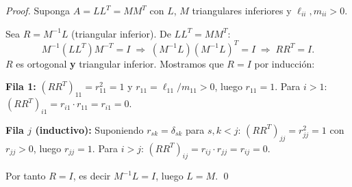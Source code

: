 \documentclass[11pt,a4paper]{article}
\begin{document}
\begin{proof}
Suponga $A = LL^T = MM^T$ con $L$, $M$ triangulares inferiores y $\ell_{ii},m_{ii}>0$.

Sea $R = M^{-1}L$ (triangular inferior). De $LL^T = MM^T$:
\[
  M^{-1}(LL^T)M^{-T} = I
  \;\Rightarrow\; (M^{-1}L)(M^{-1}L)^T = I
  \;\Rightarrow\; RR^T = I.
\]
$R$ es ortogonal \textbf{y} triangular inferior. Mostramos que $R = I$ por inducción:

\textbf{Fila 1:} $(RR^T)_{11} = r_{11}^2 = 1$ y $r_{11} = \ell_{11}/m_{11} > 0$,
luego $r_{11}=1$. Para $i>1$: $(RR^T)_{i1} = r_{i1}\cdot r_{11} = r_{i1} = 0$.

\textbf{Fila $j$ (inductivo):} Suponiendo $r_{sk}=\delta_{sk}$ para $s,k < j$:
$(RR^T)_{jj} = r_{jj}^2 = 1$ con $r_{jj}>0$, luego $r_{jj}=1$.
Para $i>j$: $(RR^T)_{ij} = r_{ij}\cdot r_{jj} = r_{ij} = 0$.

Por tanto $R = I$, es decir $M^{-1}L = I$, luego $L = M$. \qed
\end{proof}
\end{document}
